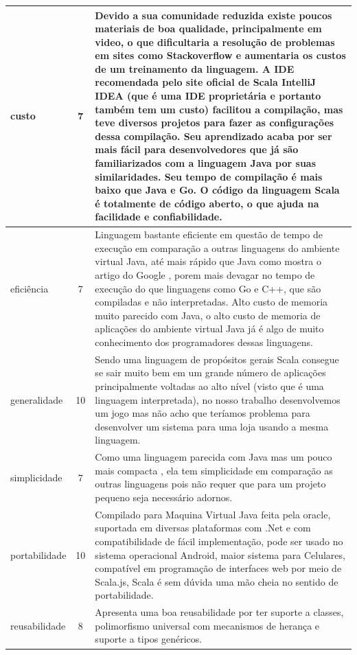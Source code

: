 \documentclass[rel-mlp]{iiufrgs}
\begin{document}
\begin{longtable}[c]{|p{4cm}|c|p{8.8cm}|}
custo                           & 7 & Devido a sua comunidade reduzida existe poucos materiais de boa qualidade, principalmente em video, o que dificultaria a resolução de problemas em sites como Stackoverflow e aumentaria os custos de um treinamento da linguagem. A IDE recomendada pelo site oficial de Scala IntelliJ IDEA (que é uma IDE proprietária e portanto também tem um custo) facilitou a compilação, mas teve diversos projetos para fazer as configurações dessa compilação. Seu aprendizado acaba por ser mais fácil para desenvolvedores que já são familiarizados com a linguagem Java por suas similaridades. Seu tempo de compilação é mais baixo que Java e Go.
O código da linguagem Scala é totalmente de código aberto, o que ajuda na facilidade e confiabilidade.
\\\hline
eficiência                      & 7 & Linguagem bastante eficiente em questão de tempo de execução em comparação a outras linguagens do ambiente virtual Java, até mais rápido que Java como mostra o artigo do Google \cite{lricjgs}, porem mais devagar no tempo de execução do que linguagens como Go e C++, que são compiladas e não interpretadas. Alto custo de memoria muito parecido com Java, o alto custo de memoria de aplicações do ambiente virtual Java já é algo de muito conhecimento dos programadores dessas linguagens.
\\\hline
generalidade                    & 10 & Sendo uma linguagem de propósitos gerais Scala consegue se sair muito bem em um grande número de aplicações principalmente voltadas ao alto nível (visto que é uma linguagem interpretada), no nosso trabalho desenvolvemos um jogo mas não acho que teríamos problema para desenvolver um sistema para uma loja usando a mesma linguagem. 
\\\hline %
simplicidade                    & 7 & Como uma linguagem parecida com Java mas um pouco mais compacta \cite{matt}, ela tem simplicidade em comparação as outras linguagens pois não requer que para um projeto pequeno seja necessário adornos. 
\\\hline
portabilidade                   & 10 & Compilado para Maquina Virtual Java  feita pela oracle, suportada em diversas plataformas com .Net e com compatibilidade de fácil implementação, pode ser usado no sistema operacional Android, maior sistema para Celulares, compatível em programação de interfaces web por meio de Scala.js, Scala é sem dúvida uma mão cheia no sentido de portabilidade.
 \\\hline
reusabilidade                   & 8 & Apresenta uma boa reusabilidade por ter suporte a classes, polimorfismo universal com mecanismos de herança e suporte a tipos genéricos.  

\end{longtable}
\end{document}
